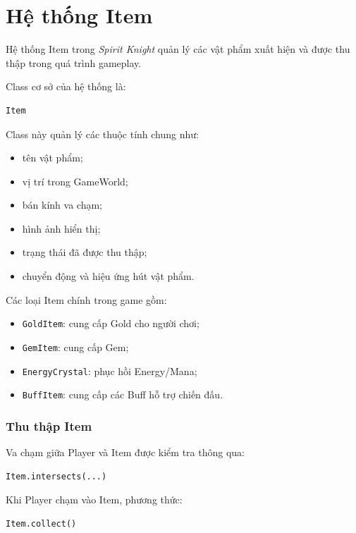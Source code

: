 \documentclass[12pt,a4paper]{report}
\begin{document}
    \chapter{Hệ thống Item}

    Hệ thống Item trong \textit{Spirit Knight} quản lý các vật phẩm
    xuất hiện và được thu thập trong quá trình gameplay.

    Class cơ sở của hệ thống là:

    \begin{verbatim}
Item
    \end{verbatim}

    Class này quản lý các thuộc tính chung như:

    \begin{itemize}
        \item tên vật phẩm;
        \item vị trí trong GameWorld;
        \item bán kính va chạm;
        \item hình ảnh hiển thị;
        \item trạng thái đã được thu thập;
        \item chuyển động và hiệu ứng hút vật phẩm.
    \end{itemize}

    Các loại Item chính trong game gồm:

    \begin{itemize}
        \item \texttt{GoldItem}: cung cấp Gold cho người chơi;
        \item \texttt{GemItem}: cung cấp Gem;
        \item \texttt{EnergyCrystal}: phục hồi Energy/Mana;
        \item \texttt{BuffItem}: cung cấp các Buff hỗ trợ chiến đấu.
    \end{itemize}

    \subsection{Thu thập Item}

    Va chạm giữa Player và Item được kiểm tra thông qua:

    \begin{verbatim}
Item.intersects(...)
    \end{verbatim}

    Khi Player chạm vào Item, phương thức:

    \begin{verbatim}
Item.collect()
    \end{verbatim}
\end{document}
